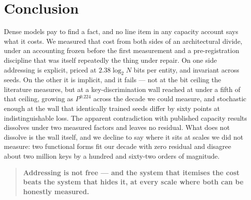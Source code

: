 \section{Conclusion}
\label{sec:conclusion}

Dense models pay to find a fact, and no line item in any capacity account says what it costs. We
measured that cost from both sides of an architectural divide, under an accounting frozen before the
first measurement and a pre-registration discipline that was itself repeatedly the thing under
repair. On one side addressing is explicit, priced at $2.38\log_2 N$ bits per entity, and invariant
across seeds. On the other it is implicit, and it fails --- not at the bit ceiling the literature
measures, but at a key-discrimination wall reached at under a fifth of that ceiling, growing as
$P^{0.224}$ across the decade we could measure, and stochastic enough at the wall that identically
trained seeds differ by sixty points at indistinguishable loss. The apparent contradiction with
published capacity results dissolves under two measured factors and leaves no residual. What does
not dissolve is the wall itself, and we decline to say where it sits at scales we did not measure:
two functional forms fit our decade with zero residual and disagree about two million keys by a
hundred and sixty-two orders of magnitude.

\begin{quote}
\textbf{Addressing is not free --- and the system that itemises the cost beats the system that hides
it, at every scale where both can be honestly measured.}
\end{quote}

